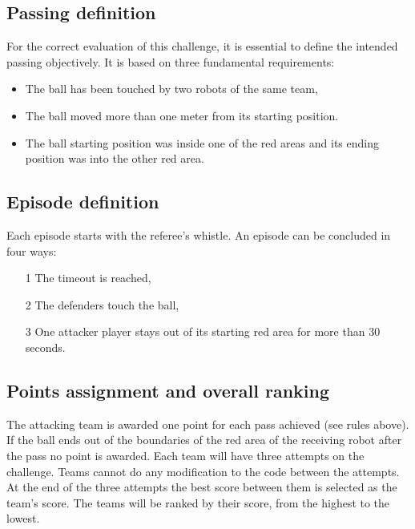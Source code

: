 \subsection{Passing definition}
For the correct evaluation of this challenge, it is essential to define the intended passing objectively. It is based on three fundamental requirements:
\begin{itemize}
    \item The ball has been touched by two robots of the same team,
    \item The ball moved more than one meter from its starting position.
   \item The ball starting position was inside one of the red areas and its ending position was into the other red area.
\end{itemize}


\subsection{Episode definition}
Each episode starts with the referee's whistle. An episode can be concluded in four ways: 
\begin{itemize}
    \item[1] The timeout is reached,
    \item[2] The defenders touch the ball,
    \item[3] One attacker player stays out of its starting red area for more than 30 seconds.

\end{itemize}

\subsection{Points assignment and overall ranking}
The attacking team is awarded one point for each pass achieved (see rules above). If the ball ends out of the boundaries of the red area of the receiving robot after the pass no point is awarded. Each team will have three attempts on the challenge. Teams cannot do any modification to the code between the attempts. At the end of the three attempts the best score between them is selected as the team's score. The teams will be ranked by their score, from the highest to the lowest. 

